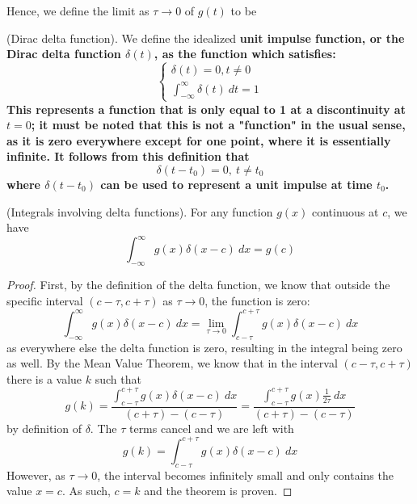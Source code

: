 \documentclass{article}
\begin{document}
Hence, we define the limit as $\tau \to 0$ of $g(t)$ to be 
\begin{definition}
    (Dirac delta function). We define the idealized \bf unit impulse function, \normalfont or the \bf Dirac delta function $\delta(t)$\normalfont , as the function which satisfies:
    \begin{equation*}
        \begin{cases}
            \delta(t) = 0, t \neq 0 \\
            \int_{-\infty}^{\infty} \delta(t)\ dt = 1
        \end{cases}
    \end{equation*}
    This represents a function that is only equal to 1 at a discontinuity at $t = 0$; it must be noted that this is not a "function" in the usual sense, as it is zero everywhere except for one point, where it is essentially infinite. It follows from this definition that 
    \begin{equation*}
        \delta(t-t_0) = 0,\ t \neq t_0
    \end{equation*}
    where $\delta(t-t_0)$ can be used to represent a unit impulse at time $t_0$.
\end{definition}
\newpage
\begin{theorem}
    (Integrals involving delta functions). For any function $g(x)$ continuous at $c$, we have
    \begin{equation*}
        \int_{-\infty}^{\infty}g(x)\delta(x-c)\ dx = g(c)
    \end{equation*}
\end{theorem}
\begin{proof}
    First, by the definition of the delta function, we know that outside the specific interval $(c - \tau, c + \tau)$ as $\tau \to 0$, the function is zero:
    \begin{equation*}
        \int_{-\infty}^{\infty}g(x)\delta(x-c)\ dx = \lim_{\tau \to 0} \int_{c-\tau}^{c+\tau} g(x)\delta(x-c)\ dx
    \end{equation*}
    as everywhere else the delta function is zero, resulting in the integral being zero as well. By the Mean Value Theorem, we know that in the interval $(c-\tau, c+\tau)$ there is a value $k$ such that 
    \begin{equation*}
        g(k) = \frac{\int_{c-\tau}^{c+\tau} g(x)\delta(x-c)\ dx}{(c+\tau)-(c-\tau)} = \frac{\int_{c-\tau}^{c+\tau} g(x)\frac{1}{2\tau}\ dx}{(c+\tau)-(c-\tau)}
    \end{equation*}
    by definition of $\delta$. The $\tau$ terms cancel and we are left with
    \begin{equation*}
        g(k) =\int_{c-\tau}^{c+\tau} g(x)\delta(x-c)\ dx
    \end{equation*}
    However, as $\tau \to 0$, the interval becomes infinitely small and only contains the value $x = c$. As such, $c = k$ and the theorem is proven.
\end{proof}
\end{document}
